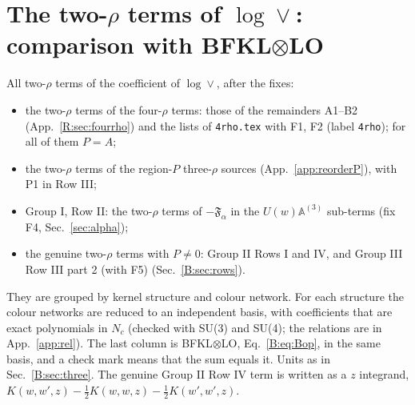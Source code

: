 \documentclass[10pt]{article}
\numberwithin{equation}{section}
\begin{document}
\section{The two-\texorpdfstring{$\rho$}{rho} terms of \texorpdfstring{$\log\vee$}{log vee}: comparison with BFKL\texorpdfstring{$\otimes$}{x}LO}\label{B:sec:two}
All two-$\rho$ terms of the coefficient of $\log\vee$, after the fixes:
\begin{itemize}
\item the two-$\rho$ terms of the four-$\rho$ terms: those of the remainders A1--B2 (App.~\ref{R:sec:fourrho}) and the lists of \texttt{4rho.tex} with F1, F2 (label \texttt{4rho}); for all of them $P=A$;
\item the two-$\rho$ terms of the region-$P$ three-$\rho$ sources (App.~\ref{app:reorderP}), with P1 in Row III;
\item Group I, Row II: the two-$\rho$ terms of $-\mathfrak F_\alpha$ in the $U(w)\mathbb A^{(3)}$ sub-terms (fix F4, Sec.~\ref{sec:alpha});
\item the genuine two-$\rho$ terms with $P\neq0$: Group II Rows I and IV, and Group III Row III part 2 (with F5) (Sec.~\ref{B:sec:rows}).
\end{itemize}
They are grouped by kernel structure and colour network. For each structure the colour networks are reduced to an independent basis, with coefficients that are exact polynomials in $N_c$ (checked with SU(3) and SU(4); the relations are in App.~\ref{app:rel}). The last column is BFKL$\otimes$LO, Eq.~\eqref{B:eq:Bop}, in the same basis, and a check mark means that the sum equals it. Units as in Sec.~\ref{B:sec:three}. The genuine Group II Row IV term is written as a $z$ integrand, $K(w,w',z)-\frac12K(w,w,z)-\frac12K(w',w',z)$.
\end{document}
